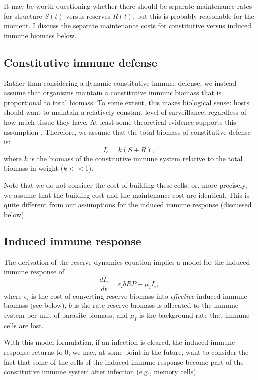 \documentclass[11pt,reqno,final,pdftex]{amsart}\usepackage[]{graphicx}\usepackage[]{color}
\theoremstyle{plain}
\numberwithin{equation}{part}
\begin{document}
It may be worth questioning whether there should be separate maintenance rates for structure $S(t)$ versus reserves $R(t)$, but this is probably reasonable for the moment.
I discuss the separate maintenance costs for constitutive versus induced immune biomass below.

\subsection*{Constitutive immune defense}
Rather than considering a dynamic constitutive immune defense, we instead assume that organisms maintain a constitutive immune biomass that is proportional to total biomass.
To some extent, this makes biological sense: hosts should want to maintain a relatively constant level of surveillance, regardless of how much tissue they have.
At least some theoretical evidence supports this assumption \citep{Wiegel2004}.
Therefore, we assume that the total biomass of constitutive defense is:
\begin{equation}
I_c=k(S+R),
\end{equation}
where $k$ is the biomass of the constitutive immune system relative to the total biomass in weight ($k<<1$).

Note that we do not consider the cost of building these cells, or, more precisely, we assume that the building cost and the maintenance cost are identical.
This is quite different from our assumptions for the induced immune response (discussed below).

\subsection*{ Induced immune response}
The derivation of the reserve dynamics equation implies a model for the induced immune response of
\begin{equation}
\frac{dI_i}{dt}=\epsilon _ib R P-\mu _II_i,
\end{equation}
where $\epsilon _i$ is the cost of converting reserve biomass into \textit{effective} induced immune biomass (see below), $b$ is the rate reserve biomass is allocated to the immune system per unit of parasite biomass, and $\mu _I$ is the background rate that immune cells are lost.

With this model formulation, if an infection is cleared, the induced immune response returns to 0; we may, at some point in the future, want to consider the fact that some of the cells of the induced immune response become part of the constitutive immune system after infection (e.g., memory cells).
\end{document}
